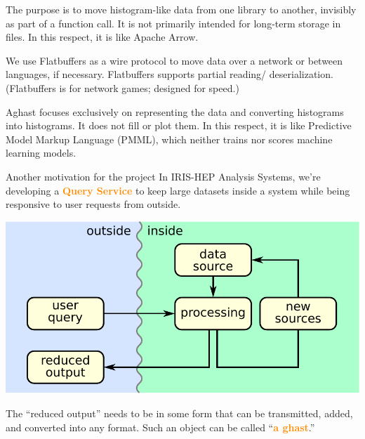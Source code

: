 \documentclass[aspectratio=169]{beamer}
\begin{document}
\begin{frame}{}
\vspace{1.25 cm}
\begin{description}\setlength{\itemsep}{0.5 cm}
\item[in-memory:] The purpose is to move histogram-like data from one library to another, invisibly as part of a function call. It is not primarily intended for long-term storage in files. In this respect, it is like Apache Arrow.

\item[serializable:]<2-> We use Flatbuffers as a wire protocol to move data over a network or between languages, if necessary. Flatbuffers supports partial reading/ deserialization. (Flatbuffers is for network games; designed for speed.)

\item[ontology:]<3-> Aghast focuses exclusively on representing the data and converting histograms into histograms. It does not fill or plot them. In this respect, it is like Predictive Model Markup Language (PMML), which neither trains nor scores machine learning models.
\end{description}
\end{frame}

\begin{frame}{Another motivation for the project}
\vspace{0.5 cm}
\large
In IRIS-HEP Analysis Systems, we're developing a \textcolor{darkorange}{\bf Query Service} to keep large datasets inside a system while being responsive to user requests from outside.

\begin{center}
\includegraphics[width=0.6\linewidth]{basic-block-diagram.pdf}
\end{center}

The ``reduced output'' needs to be in some form that can be transmitted, added, and converted into any format. Such an object can be called ``\textcolor{darkorange}{\bf a ghast}.''
\end{frame}
\end{document}
